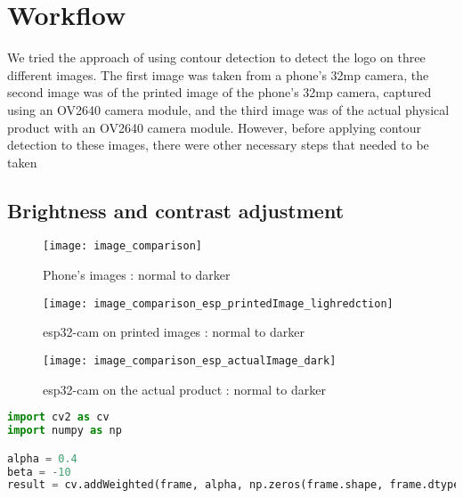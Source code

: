 \section{Workflow}
We tried the approach of using contour detection to detect the logo on three different images. The first image was taken from a phone's 32mp camera, the second image was of the printed image of the phone's 32mp camera, captured using an OV2640 camera module, and the third image was of the actual physical product with an OV2640 camera module. However, before applying contour detection to these images, there were other necessary steps that needed to be taken
\subsection{Brightness and contrast adjustment}

\FloatBarrier
\begin{figure}[h]
\FloatBarrier
         \centering
        \texttt{[image: image\_comparison]}
   
        \caption{Phone's images : normal to darker}
        \label{fig:Phone's images : normal to darker}
\FloatBarrier
    \end{figure}


\FloatBarrier
\FloatBarrier
\begin{figure}[h]
\FloatBarrier
         \centering
        \texttt{[image: image\_comparison\_esp\_printedImage\_lighredction]}
   
        \caption{esp32-cam on printed images : normal to darker}
        \label{fig:Phone's images : normal to darker}
\FloatBarrier
    \end{figure}


\FloatBarrier
\FloatBarrier
\begin{figure}[h]
\FloatBarrier
         \centering
        \texttt{[image: image\_comparison\_esp\_actualImage\_dark]}
   
        \caption{esp32-cam on the actual product : normal to darker}
        \label{fig:Phone's images : normal to darker}
\FloatBarrier
    \end{figure}


\FloatBarrier
\begin{lstlisting}[language=Python]
import cv2 as cv
import numpy as np

alpha = 0.4
beta = -10
result = cv.addWeighted(frame, alpha, np.zeros(frame.shape, frame.dtype), 0, beta)
\end{lstlisting}



